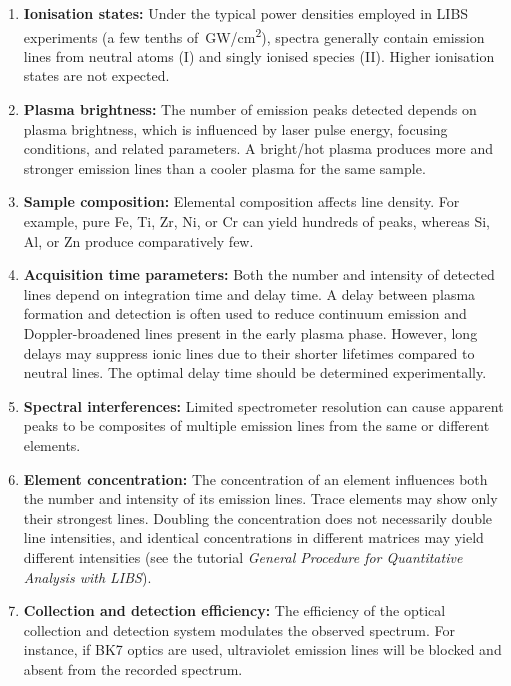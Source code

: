 \documentclass[12pt,a4paper]{article}
\begin{document}
	\begin{enumerate}[label=\textbullet]
		\item \textbf{Ionisation states:}  
		Under the typical power densities employed in LIBS experiments (a few tenths of~GW/cm\textsuperscript{2}), spectra generally contain emission lines from neutral atoms (I) and singly ionised species (II). Higher ionisation states are not expected.
		
		\item \textbf{Plasma brightness:}  
		The number of emission peaks detected depends on plasma brightness, which is influenced by laser pulse energy, focusing conditions, and related parameters. A bright/hot plasma produces more and stronger emission lines than a cooler plasma for the same sample.
		
		\item \textbf{Sample composition:}  
		Elemental composition affects line density. For example, pure Fe, Ti, Zr, Ni, or Cr can yield hundreds of peaks, whereas Si, Al, or Zn produce comparatively few.
		
		\item \textbf{Acquisition time parameters:}  
		Both the number and intensity of detected lines depend on integration time and delay time. A delay between plasma formation and detection is often used to reduce continuum emission and Doppler-broadened lines present in the early plasma phase. However, long delays may suppress ionic lines due to their shorter lifetimes compared to neutral lines. The optimal delay time should be determined experimentally.
		
		\item \textbf{Spectral interferences:}  
		Limited spectrometer resolution can cause apparent peaks to be composites of multiple emission lines from the same or different elements.
		
		\item \textbf{Element concentration:}  
		The concentration of an element influences both the number and intensity of its emission lines. Trace elements may show only their strongest lines. Doubling the concentration does not necessarily double line intensities, and identical concentrations in different matrices may yield different intensities (see the tutorial \emph{General Procedure for Quantitative Analysis with LIBS}).
		
		\item \textbf{Collection and detection efficiency:}  
		The efficiency of the optical collection and detection system modulates the observed spectrum. For instance, if BK7 optics are used, ultraviolet emission lines will be blocked and absent from the recorded spectrum.
		

\end{enumerate}
\end{document}
